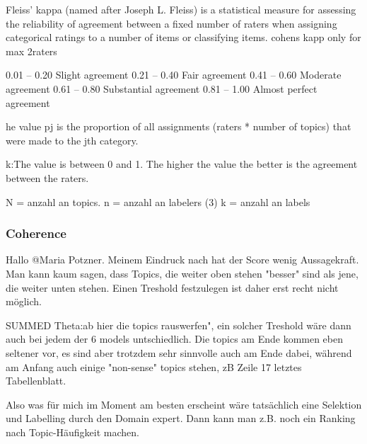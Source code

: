 %
%
%
%
%
%

Fleiss' kappa (named after Joseph L. Fleiss) is a statistical measure for assessing the reliability of agreement between a fixed number of raters when assigning categorical ratings to a number of items or classifying items.
cohens kapp only for max 2raters


0.01 – 0.20 	Slight agreement
0.21 – 0.40 	Fair agreement
0.41 – 0.60 	Moderate agreement
0.61 – 0.80 	Substantial agreement
0.81 – 1.00 	Almost perfect agreement

he value pj is the proportion of all assignments (raters * number of topics) that were made to the jth category.

k:The value is between 0 and 1.
The higher the value the better is the agreement between the raters.

N = anzahl an topics.
n = anzahl an labelers (3)
k = anzahl an labels

\subsubsection{Coherence}
Hallo @Maria Potzner. Meinem Eindruck nach hat der Score wenig Aussagekraft. Man kann kaum sagen, dass Topics, die weiter oben stehen "besser" sind als jene, die weiter unten stehen. Einen Treshold festzulegen ist daher erst recht nicht möglich.

SUMMED Theta:ab hier die topics rauswerfen", ein solcher Treshold wäre dann auch bei jedem der 6 models untschiedlich. Die topics am Ende kommen eben seltener vor, es sind aber trotzdem sehr sinnvolle auch am Ende dabei, während am Anfang auch einige "non-sense" topics stehen, zB Zeile 17 letztes Tabellenblatt.

Also was für mich im Moment am besten erscheint wäre tatsächlich eine Selektion und Labelling durch den Domain expert. Dann kann man z.B. noch ein Ranking nach Topic-Häufigkeit machen.



\newpage